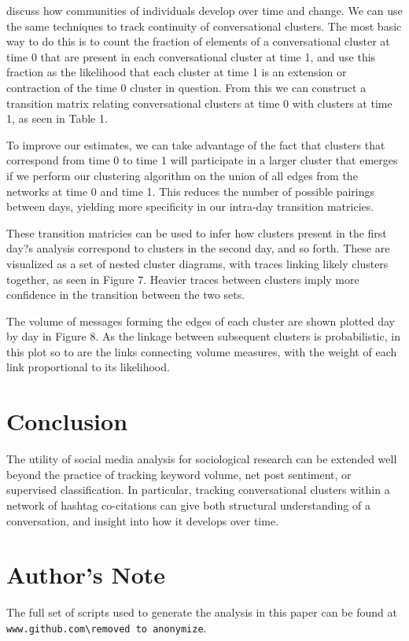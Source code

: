 \documentclass[12pt]{article}
\begin{document}
\cite{Palla2007} discuss how communities of individuals develop over time and change. We can use the same techniques to track continuity of conversational clusters. The most basic way to do this is to count the fraction of elements of a conversational cluster at time 0 that are present in each conversational cluster at time 1, and use this fraction as the likelihood that each cluster at time 1 is an extension or contraction of the time 0 cluster in question. From this we can construct a transition matrix relating conversational clusters at time 0 with clusters at time 1, as seen in Table 1.

To improve our estimates, we can take advantage of the fact that clusters that correspond from time 0 to time 1 will participate in a larger cluster that emerges if we perform our clustering algorithm on the union of all edges from the networks at time 0 and time 1. This reduces the number of possible pairings between days, yielding more specificity in our intra-day transition matricies.

These transition matricies can be used to infer how clusters present in the first day?s analysis correspond to clusters in the second day, and so forth. These are visualized as a set of nested cluster diagrams, with traces linking likely clusters together, as seen in Figure 7. Heavier traces between clusters imply more confidence in the transition between the two sets.

The volume of messages forming the edges of each cluster are shown plotted day by day in Figure 8. As the linkage between subsequent clusters is probabilistic, in this plot so to are the links connecting volume measures, with the weight of each link proportional to its likelihood.

\section{Conclusion}
The utility of social media analysis for sociological research can be extended well beyond the practice of tracking keyword volume, net post sentiment, or supervised classification. In particular, tracking conversational clusters within a network of hashtag co-citations can give both structural understanding of a conversation, and insight into how it develops over time.

\section{Author's Note}
The full set of scripts used to generate the analysis in this paper can be found at \verb|www.github.com\removed to anonymize|.



{}
\end{document}
